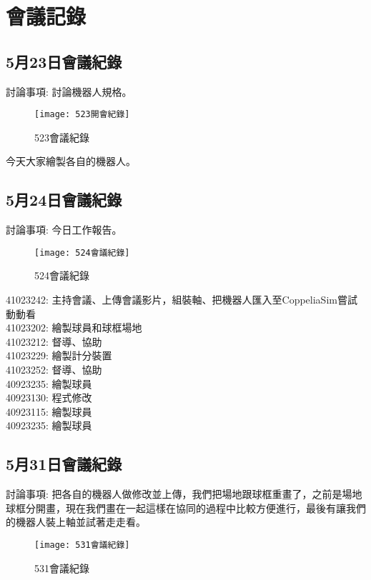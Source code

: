 \chapter{會議記錄}
\section{5月23日會議紀錄}
討論事項: 討論機器人規格。\\[6pt]
\begin{figure}[hbt!]
\begin{center}
\label{523會議紀錄}
\texttt{[image: 523開會紀錄]}
\caption{\Large 523會議紀錄}
\end{center}
\end{figure}
今天大家繪製各自的機器人。\\

\section{5月24日會議紀錄}
討論事項: 今日工作報告。\\
\begin{figure}[hbt!]
\begin{center}
\label{524會議紀錄}
\texttt{[image: 524會議紀錄]}
\caption{\Large 524會議紀錄}
\end{center}
\end{figure}
41023242: 主持會議、上傳會議影片，組裝軸、把機器人匯入至CoppeliaSim嘗試動動看\\

41023202: 繪製球員和球框場地\\

41023212: 督導、協助\\

41023229: 繪製計分裝置\\

41023252: 督導、協助\\

40923235: 繪製球員\\

40923130: 程式修改\\ 

40923115: 繪製球員\\ 

40923235: 繪製球員\\ 

\section{5月31日會議紀錄}
討論事項: 把各自的機器人做修改並上傳，我們把場地跟球框重畫了，之前是場地球框分開畫，現在我們畫在一起這樣在協同的過程中比較方便進行，最後有讓我們的機器人裝上軸並試著走走看。\\
\begin{figure}[hbt!]
\begin{center}
\label{531會議紀錄}
\texttt{[image: 531會議紀錄]}
\caption{\Large 531會議紀錄}
\end{center}
\end{figure}

\newpage
